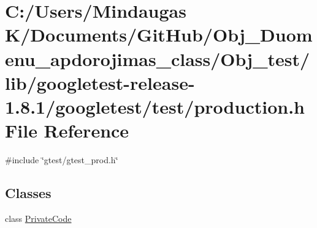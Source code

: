 \hypertarget{_obj__test_2lib_2googletest-release-1_88_81_2googletest_2test_2production_8h}{}\section{C\+:/\+Users/\+Mindaugas K/\+Documents/\+Git\+Hub/\+Obj\+\_\+\+Duomenu\+\_\+apdorojimas\+\_\+class/\+Obj\+\_\+test/lib/googletest-\/release-\/1.8.1/googletest/test/production.h File Reference}
\label{_obj__test_2lib_2googletest-release-1_88_81_2googletest_2test_2production_8h}
{\ttfamily \#include \char`\"{}gtest/gtest\+\_\+prod.\+h\char`\"{}}\newline
\subsection*{Classes}
\begin{DoxyCompactItemize}
\item 
class \mbox{\hyperlink{class_private_code}{Private\+Code}}
\end{DoxyCompactItemize}
